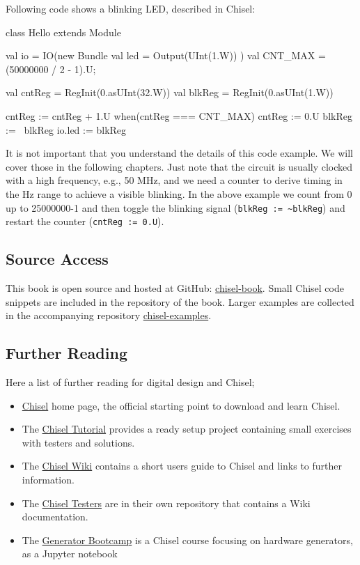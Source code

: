 \documentclass[a4paper]{article}
\newcommand{\code}[1]{{\small{\texttt{#1}}}}
\begin{document}
Following code shows a blinking LED, described in Chisel:

\begin{chisel}
class Hello extends Module {
  val io = IO(new Bundle {
    val led = Output(UInt(1.W))
  })
  val CNT_MAX = (50000000 / 2 - 1).U;
  
  val cntReg = RegInit(0.asUInt(32.W))
  val blkReg = RegInit(0.asUInt(1.W))

  cntReg := cntReg + 1.U
  when(cntReg === CNT_MAX) {
    cntReg := 0.U
    blkReg := ~blkReg
  }
  io.led := blkReg
}
\end{chisel}

It is not important that you understand the details of this code example.
We will cover those in the following chapters. Just note that the circuit is
usually clocked with a high frequency, e.g., 50 MHz, and we need a counter
to derive timing in the Hz range to achieve a visible blinking. In the above
example we count from 0 up to 25000000-1 and then toggle the blinking signal
(\code{blkReg := \textasciitilde blkReg}) and restart the counter (\code{cntReg := 0.U}).

\subsection{Source Access}

This book is open source and hosted at GitHub: \href{https://github.com/schoeberl/chisel-book}{chisel-book}.
Small Chisel code snippets are included in the repository of the book.
Larger examples are collected in the accompanying repository \href{https://github.com/schoeberl/chisel-examples}{chisel-examples}.

\subsection{Further Reading}

Here a list of further reading for digital design and Chisel;

\begin{itemize}
\item \href{https://chisel.eecs.berkeley.edu/}{Chisel} home page, the official starting point to
download and learn Chisel.
\item The \href{https://github.com/ucb-bar/chisel-tutorial}{Chisel Tutorial} provides a ready setup
project containing small exercises with testers and solutions.

\item The \href{https://github.com/freechipsproject/chisel3/wiki}{Chisel Wiki} contains
a short users guide to Chisel and links to further information.
\item The \href{https://github.com/freechipsproject/chisel-testers}{Chisel Testers} are in
their own repository that contains a Wiki documentation.
\item The \href{https://github.com/ucb-bar/generator-bootcamp}{Generator Bootcamp} is
a Chisel course focusing on hardware generators, as a Jupyter notebook
\end{itemize}
\end{document}

